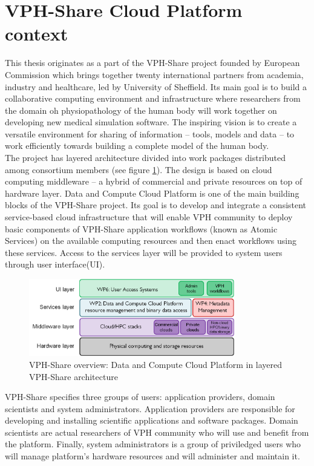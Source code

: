  

\section{VPH-Share Cloud Platform context}
This thesis originates as a part of the VPH-Share project founded by European Commission
which brings together twenty international partners from academia, industry and healthcare,
led by University of Sheffield. Its main goal is to build a collaborative computing
environment and infrastructure where researchers from the domain oh physiopathology of
the human body will work together on developing new medical simulation software. The inspiring
vision is to create a versatile environment for sharing of information -- tools, models and data
-- to work efficiently towards building a complete model of the human body.\\

The project has layered architecture divided into work packages distributed among consortium
members (see figure \ref{fig:dri-high-level}). The design is based on cloud computing middleware
-- a hybrid of commercial and private resources on top of hardware layer. Data and Compute
Cloud Platform is one of the main building blocks of the VPH-Share project. Its goal is to
develop and integrate a consistent service-based cloud infrastructure that will enable VPH
community to deploy basic components of VPH-Share application workflows (known as Atomic Services)
on the available computing resources and then enact workflows using these services. Access to the
services layer will be provided to system users through user interface(UI).

\begin{figure}[h!]
	\centering
	\includegraphics[width=0.8\textwidth]{images/vph-high-level.png}
	\caption{VPH-Share overview: Data and Compute Cloud Platform in layered VPH-Share architecture}
	\label{fig:dri-high-level}
\end{figure} 


VPH-Share specifies three groups of users:
application providers, domain scientists and system administrators. Application providers
are responsible for developing and installing scientific applications and software packages.
Domain scientists are actual researchers of VPH community who will use and benefit from 
the platform. Finally, system administrators is a group of priviledged users who will
manage platform's hardware resources and will administer and maintain it.\\


